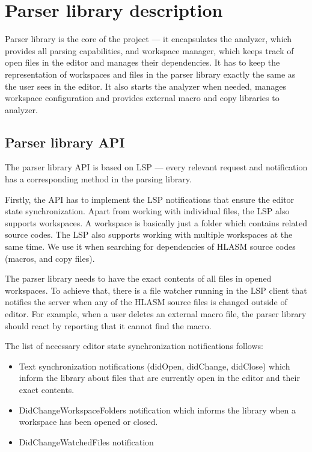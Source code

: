 \section{Parser library description}

Parser library is the core of the project --- it encapsulates the analyzer, which provides all parsing capabilities, and workspace manager, which keeps track of open files in the editor and manages their dependencies. It has to keep the representation of workspaces and files in the parser library exactly the same as the user sees in the editor. It also starts the analyzer when needed, manages workspace configuration and provides external macro and copy libraries to analyzer.

\subsection{Parser library API}
The parser library API is based on LSP --- every relevant request and notification has a corresponding method in the parsing library.

Firstly, the API has to implement the LSP notifications that ensure the editor state synchronization. Apart from working with individual files, the LSP also supports workspaces. A workspace is basically just a folder which contains related source codes. The LSP also supports working with multiple workspaces at the same time. We use it when searching for dependencies of HLASM source codes (macros, and copy files).

The parser library needs to have the exact contents of all files in opened workspaces. To achieve that, there is a file watcher running in the LSP client that notifies the server when any of the HLASM source files is changed outside of editor. For example, when a user deletes an external macro file, the parser library should react by reporting that it cannot find the macro.

The list of necessary editor state synchronization notifications follows:
\begin{itemize}
	\item Text synchronization notifications (didOpen, didChange, didClose) which inform the library about files that are currently open in the editor and their exact contents.
	\item DidChangeWorkspaceFolders notification which informs the library when a workspace has been opened or closed.
	\item DidChangeWatchedFiles notification
\end{itemize}



